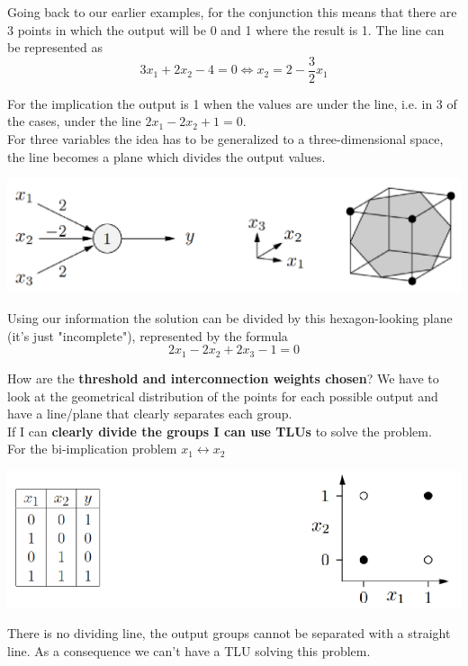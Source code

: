 Going back to our earlier examples, for the conjunction this means that there are 3 points in which the output will be 0 and 1 where the result is 1. The line can be represented as 
$$ 3 x_1 + 2 x_2 - 4 = 0 \Leftrightarrow x_2 = 2 - \frac{3}{2} x_1 $$

For the implication the output is 1 when the values are under the line, i.e. in 3 of the cases, under the line $2 x_1 - 2 x_2 + 1 = 0$.\\

For three variables the idea has to be generalized to a three-dimensional space, the line becomes a plane which divides the output values.
\begin{center}
	\includegraphics[width=0.85\columnwidth]{img/NN/TLU6}
\end{center}
Using our information the solution can be divided by this hexagon-looking plane (it's just "incomplete"), represented by the formula 
$$ 2x_1 -2x_2 +2x_3 -1 = 0 $$

\newpage

How are the \textbf{threshold and interconnection weights chosen}? We have to look at the geometrical distribution of the points for each possible output and have a line/plane that clearly separates each group.\\

If I can \textbf{clearly divide the groups I can use TLUs} to solve the problem.\\

For the bi-implication problem $x_1 \leftrightarrow x_2$
\begin{center}
	\includegraphics[width=0.9\columnwidth]{img/NN/TLU7}
\end{center}
There is no dividing line, the output groups cannot be separated with a straight line. As a consequence we can't have a TLU solving this problem.\\


